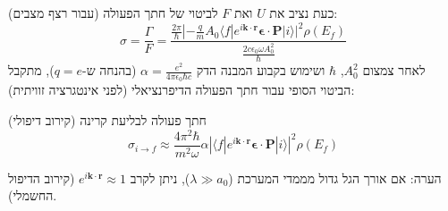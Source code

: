 כעת נציב את $U$ ואת $F$ לביטוי של חתך הפעולה (עבור רצף מצבים):
\[
\sigma = \frac{\Gamma}{F} = \frac{\frac{2\pi}{\hbar} |-\frac{q}{m} A_0 \langle f | e^{i\mathbf{k}\cdot\mathbf{r}} \boldsymbol{\epsilon}\cdot\mathbf{P} | i \rangle|^2 \rho(E_f)}{\frac{2 c \epsilon_0 \omega A_0^2}{\hbar}}
\]
לאחר צמצום $A_0^2$, $\hbar$ ושימוש בקבוע המבנה הדק $\alpha = \frac{e^2}{4\pi\epsilon_0 \hbar c}$ (בהנחה ש-$q=e$), מתקבל הביטוי הסופי עבור חתך הפעולה הדיפרנציאלי (לפני אינטגרציה זוויתית):

\begin{resultbox}{חתך פעולה לבליעת קרינה (קירוב דיפולי)}
\[
\sigma_{i \to f} \approx \frac{4\pi^2 \hbar}{m^2 \omega} \alpha \left| \langle f | e^{i\mathbf{k}\cdot\mathbf{r}} \boldsymbol{\epsilon}\cdot\mathbf{P} | i \rangle \right|^2 \rho(E_f)
\]
\end{resultbox}
הערה: אם אורך הגל גדול מממדי המערכת ($\lambda \gg a_0$), ניתן לקרב $e^{i\mathbf{k}\cdot\mathbf{r}} \approx 1$ (קירוב הדיפול החשמלי).


